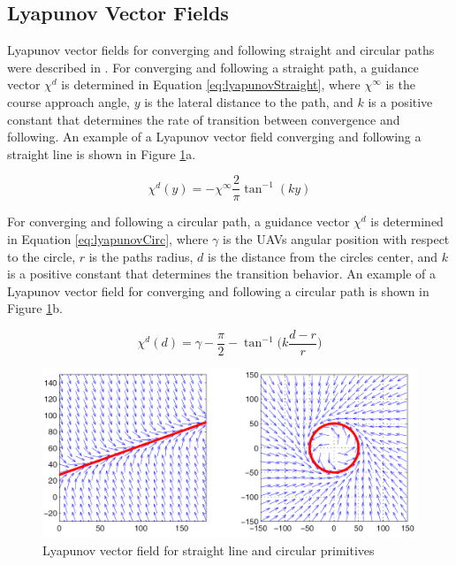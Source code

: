 \documentclass[numbered,pdftex]{ohio-etd}
\begin{document}
 
 
\subsection{Lyapunov Vector Fields}



Lyapunov vector fields for converging and following straight and circular paths were described in \cite{nelson_cooperative_2005}. For converging and following a straight path, a guidance vector $\chi^{d}$ is determined in Equation \ref{eq:lyapunovStraight}, where $\chi^{\infty}$ is the course approach angle, $y$ is the lateral distance to the path, and $k$ is a positive constant that determines the rate of transition between convergence and following. An example of a Lyapunov vector field converging and following a straight line is shown in Figure \ref{fig:vfPathPrimitives}a.




\begin{equation}\label{eq:lyapunovStraight}
\chi^d(y) = -\chi^{\infty}\frac{2}{\pi}\tan^{-1}(ky)
\end{equation}



For converging and following a circular path, a guidance vector $\chi^{d}$ is determined in Equation \ref{eq:lyapunovCirc}, where $\gamma$ is the UAVs angular position with respect to the circle, $r$ is the paths radius, $d$ is the distance from the circles center, and $k$ is a positive constant that determines the transition behavior. An example of a Lyapunov vector field for converging and following a circular path is shown in Figure \ref{fig:vfPathPrimitives}b.

\begin{equation}\label{eq:lyapunovCirc}
\chi^d(d) = \gamma-\frac{\pi}{2}-\tan^{-1} \bigg(k \frac{d-r}{r} \bigg)
\end{equation}


\begin{figure}
	\centering
	\includegraphics[width=13cm]{PaperFigures/nelsonLyapunov}
	\caption{Lyapunov vector field for straight line and circular primitives \cite{nelson_cooperative_2005}}
	\label{fig:vfPathPrimitives}
\end{figure}
\end{document}
